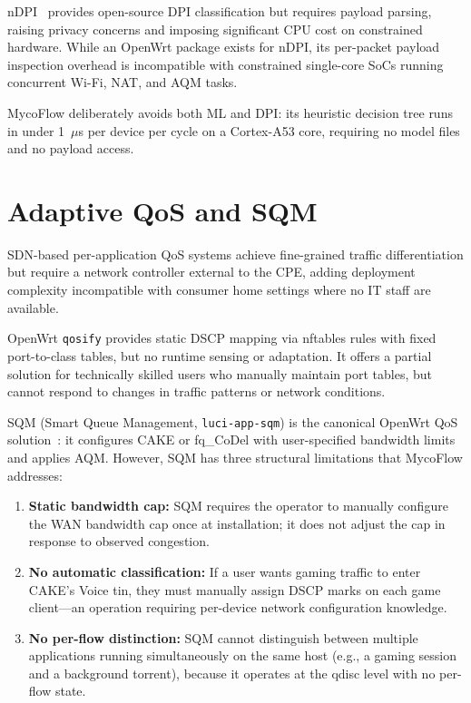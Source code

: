 nDPI~\cite{ndpi2022} provides open-source DPI classification but requires payload parsing, raising privacy concerns and imposing significant CPU cost on constrained hardware. While an OpenWrt package exists for nDPI, its per-packet payload inspection overhead is incompatible with constrained single-core SoCs running concurrent Wi-Fi, NAT, and AQM tasks.

MycoFlow deliberately avoids both ML and DPI: its heuristic decision tree runs in under 1~$\mu$s per device per cycle on a Cortex-A53 core, requiring no model files and no payload access.

\section{Adaptive QoS and SQM}

SDN-based per-application QoS systems achieve fine-grained traffic differentiation but require a network controller external to the CPE, adding deployment complexity incompatible with consumer home settings where no IT staff are available.

OpenWrt \texttt{qosify} provides static DSCP mapping via nftables rules with fixed port-to-class tables, but no runtime sensing or adaptation. It offers a partial solution for technically skilled users who manually maintain port tables, but cannot respond to changes in traffic patterns or network conditions.

SQM (Smart Queue Management, \texttt{luci-app-sqm}) is the canonical OpenWrt QoS solution~\cite{cake2018}: it configures CAKE or fq\_CoDel with user-specified bandwidth limits and applies AQM. However, SQM has three structural limitations that MycoFlow addresses:

\begin{enumerate}
  \item \textbf{Static bandwidth cap:} SQM requires the operator to manually configure the WAN bandwidth cap once at installation; it does not adjust the cap in response to observed congestion.
  \item \textbf{No automatic classification:} If a user wants gaming traffic to enter CAKE's Voice tin, they must manually assign DSCP marks on each game client---an operation requiring per-device network configuration knowledge.
  \item \textbf{No per-flow distinction:} SQM cannot distinguish between multiple applications running simultaneously on the same host (e.g., a gaming session and a background torrent), because it operates at the qdisc level with no per-flow state.
\end{enumerate}

